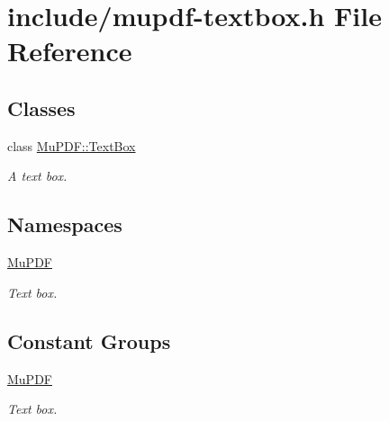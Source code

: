 \hypertarget{mupdf-textbox_8h}{\section{include/mupdf-\/textbox.h File Reference}
\label{mupdf-textbox_8h}
}
\subsection*{Classes}
\begin{DoxyCompactItemize}
\item 
class \hyperlink{class_mu_p_d_f_1_1_text_box}{Mu\-P\-D\-F\-::\-Text\-Box}
\begin{DoxyCompactList}\small\item\em A text box. \end{DoxyCompactList}\end{DoxyCompactItemize}
\subsection*{Namespaces}
\begin{DoxyCompactItemize}
\item 
\hyperlink{namespace_mu_p_d_f}{Mu\-P\-D\-F}
\begin{DoxyCompactList}\small\item\em Text box. \end{DoxyCompactList}\end{DoxyCompactItemize}
\subsection*{Constant Groups}
\begin{DoxyCompactItemize}
\item 
\hyperlink{namespace_mu_p_d_f}{Mu\-P\-D\-F}
\begin{DoxyCompactList}\small\item\em Text box. \end{DoxyCompactList}\end{DoxyCompactItemize}
